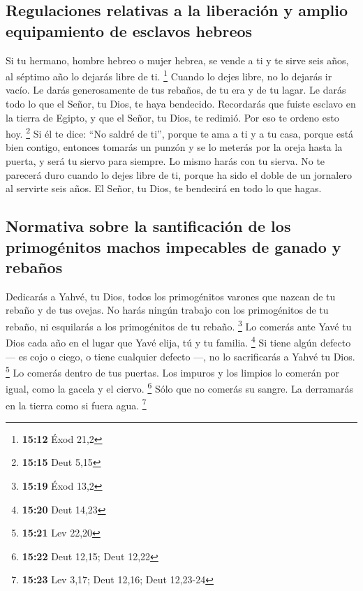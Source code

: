 \begin{paracol}{2}
\hypertarget{regulaciones-relativas-a-la-liberaciuxf3n-y-amplio-equipamiento-de-esclavos-hebreos}{%
\subsection{Regulaciones relativas a la liberación y amplio equipamiento
de esclavos
hebreos}\label{regulaciones-relativas-a-la-liberaciuxf3n-y-amplio-equipamiento-de-esclavos-hebreos}}

 Si tu hermano, hombre hebreo o mujer hebrea, se vende a
ti y te sirve seis años, al séptimo año lo dejarás libre de ti.
\footnote{\textbf{15:12} Éxod 21,2}  Cuando lo dejes
libre, no lo dejarás ir vacío.  Le darás generosamente de
tus rebaños, de tu era y de tu lagar. Le darás todo lo que el Señor, tu
Dios, te haya bendecido.  Recordarás que fuiste esclavo
en la tierra de Egipto, y que el Señor, tu Dios, te redimió. Por eso te
ordeno esto hoy. \footnote{\textbf{15:15} Deut 5,15}  Si
él te dice: ``No saldré de ti'', porque te ama a ti y a tu casa, porque
está bien contigo,  entonces tomarás un punzón y se lo
meterás por la oreja hasta la puerta, y será tu siervo para siempre. Lo
mismo harás con tu sierva.  No te parecerá duro cuando lo
dejes libre de ti, porque ha sido el doble de un jornalero al servirte
seis años. El Señor, tu Dios, te bendecirá en todo lo que hagas.

\hypertarget{normativa-sobre-la-santificaciuxf3n-de-los-primoguxe9nitos-machos-impecables-de-ganado-y-rebauxf1os}{%
\subsection{Normativa sobre la santificación de los primogénitos machos
impecables de ganado y
rebaños}\label{normativa-sobre-la-santificaciuxf3n-de-los-primoguxe9nitos-machos-impecables-de-ganado-y-rebauxf1os}}

 Dedicarás a Yahvé, tu Dios, todos los primogénitos
varones que nazcan de tu rebaño y de tus ovejas. No harás ningún trabajo
con los primogénitos de tu rebaño, ni esquilarás a los primogénitos de
tu rebaño. \footnote{\textbf{15:19} Éxod 13,2}  Lo
comerás ante Yavé tu Dios cada año en el lugar que Yavé elija, tú y tu
familia. \footnote{\textbf{15:20} Deut 14,23}  Si tiene
algún defecto --- es cojo o ciego, o tiene cualquier defecto ---, no lo
sacrificarás a Yahvé tu Dios. \footnote{\textbf{15:21} Lev 22,20}
 Lo comerás dentro de tus puertas. Los impuros y los
limpios lo comerán por igual, como la gacela y el ciervo. \footnote{\textbf{15:22}
  Deut 12,15; Deut 12,22}  Sólo que no comerás su sangre.
La derramarás en la tierra como si fuera agua. \footnote{\textbf{15:23}
  Lev 3,17; Deut 12,16; Deut 12,23-24}


\end{paracol}
